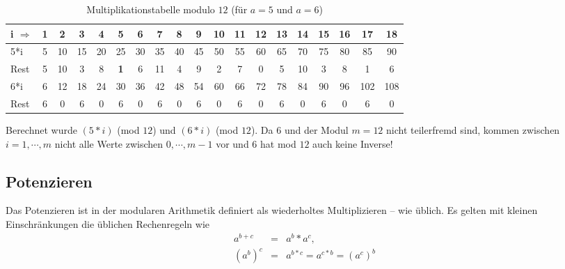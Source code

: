 \begin{refsegment}
\begin{table}[ht]
\begin{center}                                                                  \begin{tabular}{|l@{\:}||c|c|c|c|c|c|c|c|c|c|c||c|c|c|c|c|c|c|}
\hline
i $\Rightarrow$      & 1  & 2  & 3  & 4  & 5  & 6  & 7  & 8  & 9 & 10 & 11 & 12 & 13 & 14 & 15 & 16  & 17  & 18\\
\hline
\hline
5*i                  & 5 & 10 & 15 & 20 & 25 & 30 & 35 & 40 & 45 & 50 & 55 & 60 & 65 & 70 & 75 & 80  & 85  & 90\\
Rest                 & 5 & 10  & 3  & 8  & {\bf 1}  & 6 & 11  & 4  & 9  & 2  & 7  & 0  & 5 & 10  & 3  & 8   & 1   & 6\\
\hline
6*i                  & 6 & 12 & 18 & 24 & 30 & 36 & 42 & 48 & 54 & 60 & 66 & 72 & 78 & 84 & 90 & 96 & 102 & 108\\
Rest                 & 6  & 0  & 6  & 0  & 6  & 0  & 6  & 0  & 6  & 0  & 6  & 0  & 6  & 0  & 6  & 0   & 6   & 0\\
\hline
\end{tabular}
\end{center}
\caption{Multiplikationstabelle modulo $12$ (für $a=5$ und $a=6$)}
\label{mulmod12}
\end{table}

Berechnet wurde $(5 * i)$ (mod $12$) und $(6*i)$ (mod $12$).
Da $6$ und der Modul $m=12$ nicht teilerfremd
sind, kommen zwischen $i=1, \cdots, m$ nicht alle Werte zwischen
$0, \cdots, m-1$ vor und $6$ hat mod $12$ auch keine Inverse!
 




\subsection{Potenzieren}
Das Potenzieren ist in der modularen Arithmetik definiert als wiederholtes
Multiplizieren -- wie üblich.
Es gelten mit kleinen Einschränkungen die üblichen Rechenregeln wie
\begin{eqnarray*}
a^{b+c} & = & a^b * a^c,  \nonumber\\
(a^b)^c & = & a^{b*c} = a^{c*b} = (a^c)^b \nonumber
\end{eqnarray*}



\end{refsegment}
